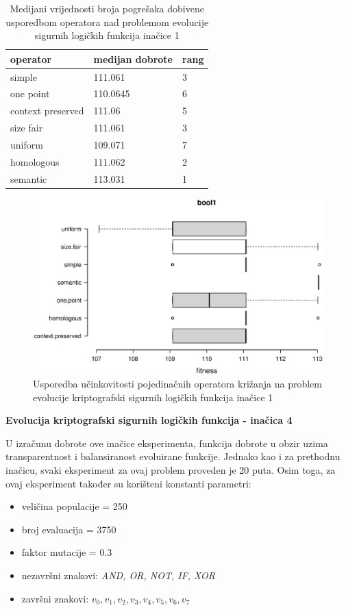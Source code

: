 \begin{table}[H]
 	\centering
\caption{Medijani vrijednosti broja pogrešaka dobivene usporedbom operatora nad problemom evolucije sigurnih logičkih funkcija inačice 1}
    \begin{tabular}{| l | l | l |}
    \hline
    \textbf{operator} & \textbf{medijan dobrote} & \textbf{rang}\\ \hline
    simple & 111.061 & 3\\ \hline
    one point & 110.0645 & 6\\ \hline
    context preserved & 111.06 & 5\\ \hline
    size fair & 111.061 & 3\\ \hline
    uniform & 109.071 & 7\\ \hline
    homologous & 111.062 & 2\\ \hline
    semantic & 113.031& 1\\ \hline
    \end{tabular}
    
    
    \label{bool1table}
\end{table}

\begin{figure}[H]
	\centering
	\includegraphics[trim=0cm 4cm 0cm 0cm, scale=0.5]{./slike/boxPlots/bool1.eps}
	\caption{Usporedba učinkovitosti pojedinačnih operatora križanja na problem evolucije kriptografski sigurnih logičkih funkcija inačice 1}
	\label{bool1box}
\end{figure}


\textbf{Evolucija kriptografski sigurnih logičkih funkcija - inačica 4}

U izračunu dobrote ove inačice eksperimenta, funkcija dobrote u obzir uzima transparentnost i balansiranost evoluirane funkcije. Jednako kao i za prethodnu inačicu, svaki eksperiment za ovaj problem proveden je 20 puta. Osim toga, za  ovaj eksperiment također su korišteni konstanti parametri:
\begin{itemize}
\item{veličina populacije = 250}
\item{broj evaluacija = 3750}
\item{faktor mutacije = 0.3}
\item{nezavršni znakovi: \textit{AND, OR, NOT, IF, XOR}}
\item{završni znakovi: \textit{$v_0, v_1, v_2, v_3, v_4, v_5, v_6, v_7$}}
\end{itemize}

